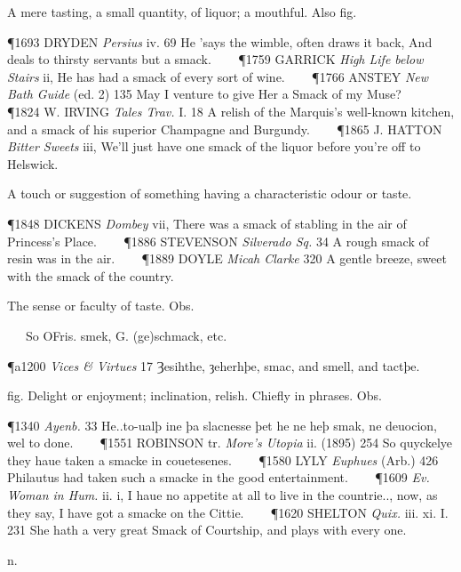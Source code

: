 \begin{description}[wide, labelwidth=!, labelindent=0pt]
\begin{myenumerate}
 A mere tasting, a small quantity, of liquor; a mouthful. Also fig.

\P 1693 DRYDEN  \textit{Persius} iv. 69 He 'says the wimble, often draws it back, And deals to thirsty servants but a smack.    
\P 1759 GARRICK  \textit{High Life below Stairs} ii, He has had a smack of every sort of wine.    
\P 1766 ANSTEY  \textit{New Bath Guide} (ed. 2) 135 May I venture to give Her a Smack of my Muse?    
\P 1824 W. IRVING  \textit{Tales Trav.} I. 18 A relish of the Marquis's well-known kitchen, and a smack of his superior Champagne and Burgundy.    
\P 1865 J. HATTON  \textit{Bitter Sweets} iii, We'll just have one smack of the liquor before you're off to Helswick.

 A touch or suggestion of something having a characteristic odour or taste.

\P 1848 DICKENS  \textit{Dombey} vii, There was a smack of stabling in the air of Princess's Place.    
\P 1886 STEVENSON  \textit{Silverado Sq.} 34 A rough smack of resin was in the air.    
\P 1889 DOYLE  \textit{Micah Clarke} 320 A gentle breeze, sweet with the smack of the country.

  The sense or faculty of taste. Obs.

   So OFris. smek, G. (ge)schmack, etc.

\P a1200 \textit{Vices \& Virtues} 17 Ȝesihthe, ȝeherhþe, smac, and smell, and tactþe.

 fig. Delight or enjoyment; inclination, relish. Chiefly in phrases. Obs.

\P 1340  \textit{Ayenb.} 33 He..to-ualþ ine þa slacnesse þet he ne heþ smak, ne deuocion, wel to done.    
\P 1551 ROBINSON tr.  \textit{More's Utopia} ii. (1895) 254 So quyckelye they haue taken a smacke in couetesenes.    
\P 1580 LYLY  \textit{Euphues} (Arb.) 426 Philautus had taken such a smacke in the good entertainment.    
\P 1609 \textit{Ev. Woman in  Hum.} ii. i, I haue no appetite at all to live in the countrie.., now, as they say, I have got a smacke on the Cittie.    
\P 1620 SHELTON  \textit{Quix.} iii. xi. I. 231 She hath a very great Smack of Courtship, and plays with every one.
\end{myenumerate}


 n.

\noindent {}

\noindent [a. F. levain (recorded from 12-13th c.) = Prov. levam:—L. levāmen means of raising (recorded only in the sense ‘alleviation, relief, comfort’), f. levāre (F. lever) to raise.]
\vspace{-0.3cm}


\end{description}
